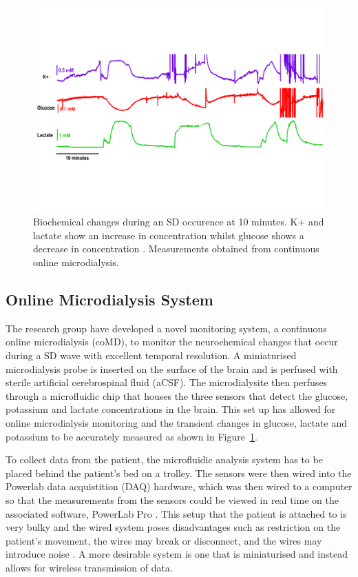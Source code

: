 \begin{figure}[t!]
\centering
\includegraphics[trim={0cm 5cm 0.5cm  5cm}, clip, width=1\textwidth]{./figures/conc.pdf}
\captionsetup{justification=centering}
\caption{Biochemical changes during an SD occurence at 10 minutes. K+ and lactate show an increase in concentration whilst glucose shows a decrease in concentration \cite{Rogers2017}. Measurements obtained from continuous online microdialysis.}
\label{fig: SD}
\end{figure}

\subsection{Online Microdialysis System}
The research group have developed a novel monitoring system, a continuous online microdialysis (coMD), to monitor the neurochemical changes that occur during a SD wave with excellent temporal resolution. A miniaturised microdialysis probe is inserted on the surface of the brain and is perfused with sterile artificial cerebrospinal fluid (aCSF). The microdialysite then perfuses through a microfluidic chip that houses the three sensors that detect the glucose, potassium and lactate concentrations in the brain. This set up has allowed for online microdialysis monitoring and the transient changes in glucose, lactate and potassium to be accurately measured \cite{Rogers2017} as shown in Figure~\ref{fig: SD}.

To collect data from the patient, the microfluidic analysis system has to be placed behind the patient's bed on a trolley. The sensors were then wired into the Powerlab data acquistition (DAQ) hardware, which was then wired to a computer so that the measurements from the sensors could be viewed in real time on the associated software, PowerLab Pro \cite{Rogers2017}. This setup that the patient is attached to is very bulky and the wired system poses disadvantages such as restriction on the patient's movement, the wires may break or disconnect, and the wires may introduce noise \cite{Ferguson2011}. A more desirable system is one that is miniaturised and instead allows for wireless transmission of data.



